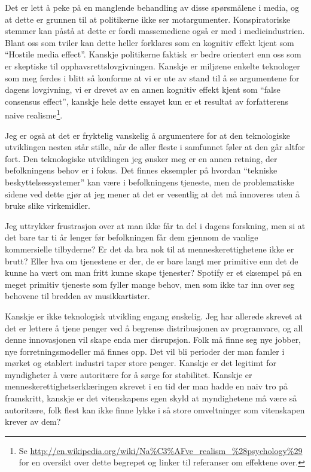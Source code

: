 \documentclass[11pt,norsk,a4paper]{article}
\begin{document}
Det er lett å peke på en manglende behandling av disse spørsmålene i
media, og at dette er grunnen til at politikerne ikke ser
motargumenter. Konspiratoriske stemmer kan påstå at dette er fordi
massemediene også er med i medieindustrien. Blant oss som tviler kan
dette heller forklares som en kognitiv effekt kjent som ``Hostile
media effect''. Kanskje politikerne faktisk \emph{er} bedre orientert
enn oss som er skeptiske til opphavsrettslovgivningen. Kanskje er
miljøene enkelte teknologer som meg ferdes i blitt så konforme at vi
er ute av stand til å se argumentene for dagens lovgivning, vi er
drevet av en annen kognitiv effekt kjent som ``false consensus
effect'', kanskje hele dette essayet kun er et resultat av
forfatterens naive
realisme\footnote{Se \url{http://en.wikipedia.org/wiki/Na\%C3\%AFve_realism_\%28psychology\%29}
for en oversikt over dette begrepet og linker til referanser om
effektene over.}.

Jeg er også at det er fryktelig vanskelig å argumentere for at
den teknologiske utviklingen nesten står stille, når de aller fleste i
samfunnet føler at den går altfor fort. Den teknologiske utviklingen
jeg ønsker meg er en annen retning, der befolkningens behov er i
fokus. Det finnes  eksempler på hvordan ``tekniske
beskyttelsessystemer'' kan være i befolkningens tjeneste, men de
problematiske sidene ved dette gjør at jeg mener at det er vesentlig
at det må innoveres uten å bruke slike virkemidler.

Jeg uttrykker frustrasjon over at man ikke får ta del i dagens
forskning, men si at det bare tar ti år lenger før befolkningen får
dem gjennom de vanlige kommersielle tilbyderne? Er det da bra nok til
at menneskerettighetene ikke er brutt? Eller hva om tjenestene er der,
de er bare langt mer primitive enn det de kunne ha vært om man fritt
kunne skape tjenester? Spotify er et eksempel på en meget
primitiv tjeneste som fyller mange behov, men som ikke tar inn over
seg behovene til bredden av musikkartister. 

Kanskje er ikke teknologisk utvikling engang ønskelig. Jeg har
allerede skrevet at det er lettere å tjene penger ved å begrense
distribusjonen av programvare, og all denne innovasjonen vil skape
enda mer disrupsjon. Folk må finne seg nye jobber, nye
forretningsmodeller må finnes opp. Det vil bli perioder der man famler
i mørket og etablert industri taper store penger. Kanskje er det
legitimt for myndigheter å være autoritære for å sørge for
stabilitet. Kanskje er menneskerettighetserklæringen skrevet i en tid
der man hadde en naiv tro på framskritt, kanskje er det vitenskapens
egen skyld at myndighetene må være så autoritære, folk flest kan ikke
finne lykke i  så store omveltninger som vitenskapen krever av dem?
\end{document}
